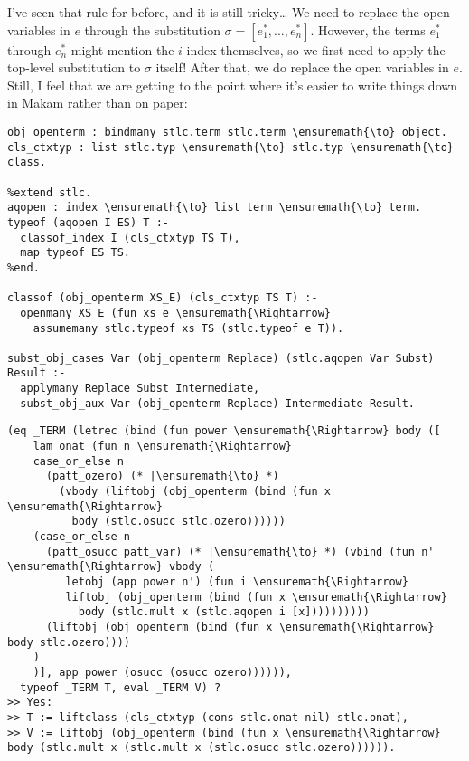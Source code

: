 \heroSTUDENT{} I've seen that rule for  before, and it is
still tricky\ldots{} We need to replace the open variables in \(e\)
through the substitution \(\sigma = [e^*_1, \text{...}, e^*_n]\).
However, the terms \(e^*_1\) through \(e^*_n\) might mention the \(i\)
index themselves, so we first need to apply the top-level substitution
to \(\sigma\) itself! After that, we do replace the open variables in
\(e\). Still, I feel that we are getting to the point where it's easier
to write things down in Makam rather than on paper:

\begin{verbatim}
obj_openterm : bindmany stlc.term stlc.term \ensuremath{\to} object.
cls_ctxtyp : list stlc.typ \ensuremath{\to} stlc.typ \ensuremath{\to} class.

%extend stlc.
aqopen : index \ensuremath{\to} list term \ensuremath{\to} term.
typeof (aqopen I ES) T :-
  classof_index I (cls_ctxtyp TS T),
  map typeof ES TS.
%end.

classof (obj_openterm XS_E) (cls_ctxtyp TS T) :-
  openmany XS_E (fun xs e \ensuremath{\Rightarrow}
    assumemany stlc.typeof xs TS (stlc.typeof e T)).

subst_obj_cases Var (obj_openterm Replace) (stlc.aqopen Var Subst) Result :-
  applymany Replace Subst Intermediate,
  subst_obj_aux Var (obj_openterm Replace) Intermediate Result.
\end{verbatim}

\begin{verbatim}
(eq _TERM (letrec (bind (fun power \ensuremath{\Rightarrow} body ([
    lam onat (fun n \ensuremath{\Rightarrow}
    case_or_else n
      (patt_ozero) (* |\ensuremath{\to} *)
        (vbody (liftobj (obj_openterm (bind (fun x \ensuremath{\Rightarrow}
          body (stlc.osucc stlc.ozero))))))
    (case_or_else n
      (patt_osucc patt_var) (* |\ensuremath{\to} *) (vbind (fun n' \ensuremath{\Rightarrow} vbody (
         letobj (app power n') (fun i \ensuremath{\Rightarrow}
         liftobj (obj_openterm (bind (fun x \ensuremath{\Rightarrow}
           body (stlc.mult x (stlc.aqopen i [x])))))))))
      (liftobj (obj_openterm (bind (fun x \ensuremath{\Rightarrow} body stlc.ozero))))
    )
    )], app power (osucc (osucc ozero)))))),
  typeof _TERM T, eval _TERM V) ?
>> Yes:
>> T := liftclass (cls_ctxtyp (cons stlc.onat nil) stlc.onat),
>> V := liftobj (obj_openterm (bind (fun x \ensuremath{\Rightarrow} body (stlc.mult x (stlc.mult x (stlc.osucc stlc.ozero)))))).
\end{verbatim}

